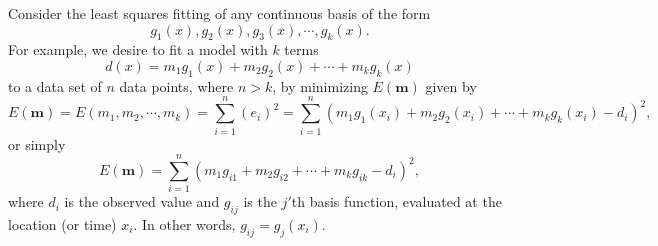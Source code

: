 Consider the least squares fitting of any continuous basis of the form
\begin{equation}
g_1(x), g_2(x), g_3(x), \cdots , g_k(x).
\end{equation}
For example, we desire to fit a model with $k$ terms
\begin{equation}
d(x) = m_1g_1(x) + m_2g_2(x) + \cdots + m_k g_k(x)
\label{eq:lsgenmodel}
\end{equation}
to a data set of $n$  data points, where $n > k$, by minimizing $E(\mathbf{m})$ given by
\begin{equation}
E(\mathbf{m}) = E(m_1, m_2, \cdots, m_k) = \sum ^n _{i=1}  (e_i)^2  = \sum ^n _{i=1} (m_1 g_1(x_i) + m_2g_2(x_i) + \cdots + m_k g_k(x_i) - d_i)^2,
\end{equation}
or simply
\begin{equation}
E(\mathbf{m}) = \sum ^n _{i=1} (m_1g_{i1} + m_2g_{i2} + \cdots + m_k g_{ik} - d_i)^2,
\label{eq:L2_misfit}
\end{equation}
where $d_i$ is the observed value and $g_{ij}$ is the $j'$th basis function, evaluated at the location (or time) $x_i$. In other words,
$g_{ij} = g_j(x_i)$.

